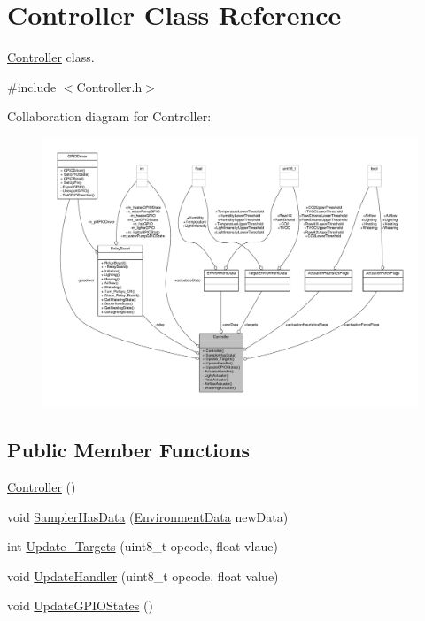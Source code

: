 \hypertarget{classController}{}\section{Controller Class Reference}
\label{classController}


\hyperlink{classController}{Controller} class.  




{\ttfamily \#include $<$Controller.\+h$>$}



Collaboration diagram for Controller\+:\nopagebreak
\begin{figure}[H]
\begin{center}
\leavevmode
\includegraphics[width=350pt]{classController__coll__graph}
\end{center}
\end{figure}
\subsection*{Public Member Functions}
\begin{DoxyCompactItemize}
\item 
\hyperlink{classController_a95c56822d667e94b031451729ce069a9}{Controller} ()
\item 
void \hyperlink{classController_a4b765eaaf8f72e964118967f86c265e2}{Sampler\+Has\+Data} (\hyperlink{structEnvironmentData}{Environment\+Data} new\+Data)
\item 
int \hyperlink{classController_a0eb08a1d38b2c79e2d140476fd097f24}{Update\+\_\+\+Targets} (uint8\+\_\+t opcode, float vlaue)
\item 
void \hyperlink{classController_a0a17902e4a70fde975c989c5275e8f05}{Update\+Handler} (uint8\+\_\+t opcode, float value)
\item 
void \hyperlink{classController_a841b5219b4f48dbfd7b01fab727e7a2c}{Update\+G\+P\+I\+O\+States} ()
\end{DoxyCompactItemize}
